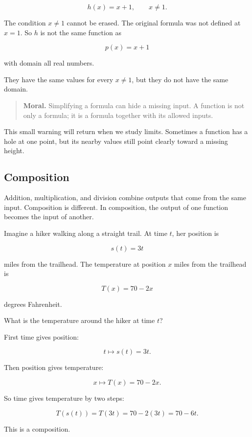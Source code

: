 \[
h(x)=x+1,
\qquad x\neq 1.
\]

The condition \(x\neq 1\) cannot be erased. The original formula was not defined at \(x=1\). So \(h\) is not the same function as

\[
p(x)=x+1
\]

with domain all real numbers.

They have the same values for every \(x\neq 1\), but they do not have the same domain.

\begin{quote}
\textbf{Moral.}
Simplifying a formula can hide a missing input. A function is not only a formula; it is a formula together with its allowed inputs.
\end{quote}

This small warning will return when we study limits. Sometimes a function has a hole at one point, but its nearby values still point clearly toward a missing height.

\subsection{Composition}
\label{subsec:composition}

Addition, multiplication, and division combine outputs that come from the same input. Composition is different. In composition, the output of one function becomes the input of another.

Imagine a hiker walking along a straight trail. At time \(t\), her position is

\[
s(t)=3t
\]

miles from the trailhead. The temperature at position \(x\) miles from the trailhead is

\[
T(x)=70-2x
\]

degrees Fahrenheit.

What is the temperature around the hiker at time \(t\)?

First time gives position:

\[
t\mapsto s(t)=3t.
\]

Then position gives temperature:

\[
x\mapsto T(x)=70-2x.
\]

So time gives temperature by two steps:

\[
T(s(t))=T(3t)=70-2(3t)=70-6t.
\]

This is a composition.

